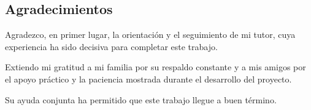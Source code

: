 {}

\thispagestyle{empty}       %

\vspace*{\fill}             %
\begin{center}
\chapter*{Agradecimientos}

Agradezco, en primer lugar, la orientación y el seguimiento de mi tutor,  
cuya experiencia ha sido decisiva para completar este trabajo.

Extiendo mi gratitud a mi familia por su respaldo constante y a mis amigos  
por el apoyo práctico y la paciencia mostrada durante el desarrollo del proyecto.

Su ayuda conjunta ha permitido que este trabajo llegue a buen término.
\end{center}
\vspace*{\fill}             %
